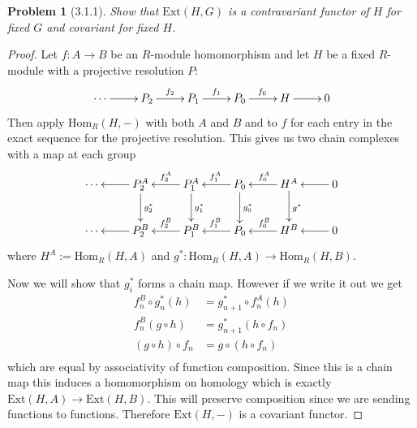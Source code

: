 \documentclass[10pt]{article}
\newcommand{\Ext}{\mathrm{Ext}}
\newcommand{\Hom}{\mathrm{Hom}}
\theoremstyle{plain}
\newtheorem{problem}{Problem}
\theoremstyle{remark}
\begin{document}
\begin{problem}[3.1.1]
  Show that $\Ext(H,G)$ is a contravariant functor of $H$ for fixed $G$ and
  covariant for fixed $H$.
\end{problem}

\begin{proof}
  Let $f:A\rightarrow B$ be an $R$-module homomorphism and let $H$ be a fixed
  $R$-module with a projective resolution $P$:
  \[
    \xymatrix{
      \cdots \ar[r] & P_2 \ar[r]^{f_2}& P_1 \ar[r]^{f_1} & P_0 \ar[r]^{f_0} & H \ar[r] & 0
    }
  \]
  Then apply $\Hom_R(H,-)$ with both $A$ and $B$ and to $f$ for each entry in
  the exact sequence for the projective resolution. This gives us two chain
  complexes with a map at each group
  \[
    \xymatrix{
      \cdots & \ar[l] P_2^A \ar[d]^{g_2^*}& \ar[l]_{f_2^A} P_1^A \ar[d]^{g_1^*}& \ar[l]_{f_1^A} P_0 \ar[d]^{g_0^*}& \ar[l]_{f_0^A} H^A\ar[d]^{g^*} & \ar[l] 0\\
      \cdots & \ar[l] P_2^B & \ar[l]_{f_2^B} P_1^B & \ar[l]_{f_1^B} P_0 & \ar[l]_{f_0^B} H^B & \ar[l] 0
    }
  \]
  where $H^A:=\Hom_R(H,A)$ and $g^*:\Hom_R(H,A)\rightarrow\Hom_R(H,B)$.

  Now we will show that $g_i^*$ forms a chain map. However if we write it out we
  get
  \begin{align*}
    f_n^B\circ g_n^*(h)&=g_{n+1}^*\circ f_n^A(h)\\
    f_n^B(g\circ h) &= g_{n+1}^*(h\circ f_n)\\
    (g\circ h)\circ f_n &= g\circ(h\circ f_n)\\
  \end{align*}
  which are equal by associativity of function composition. Since
  this is a chain map this induces a homomorphism on homology which
  is exactly $\Ext(H,A)\rightarrow\Ext(H,B)$. This will preserve
  composition since we are sending functions to functions. Therefore
  $\Ext(H,-)$ is a covariant functor.


\end{proof}
\end{document}
